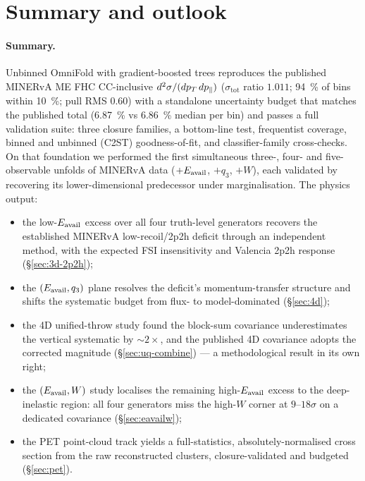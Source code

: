 \section{Summary and outlook}
\label{sec:summary}

\paragraph{Summary.}
Unbinned OmniFold with gradient-boosted trees reproduces the published
MINERvA ME FHC CC-inclusive $d^{2}\sigma/(dp_{T}\,dp_{\parallel})$
($\sigma_{\mathrm{tot}}$ ratio $1.011$; \SI{94}{\percent} of bins within
\SI{10}{\percent}; pull RMS $0.60$) with a standalone uncertainty budget that
matches the published total (\SI{6.87}{\percent} vs \SI{6.86}{\percent}
median per bin) and passes a full validation suite: three closure families, a
bottom-line test, frequentist coverage, binned and unbinned (C2ST)
goodness-of-fit, and classifier-family cross-checks. On that foundation we
performed the first simultaneous three-, four- and five-observable unfolds of
MINERvA data ($+E_{\mathrm{avail}}$, $+q_{3}$, $+W$), each validated by recovering its
lower-dimensional predecessor under marginalisation. The physics output:
\begin{itemize}[itemsep=2pt]
  \item the low-$E_{\mathrm{avail}}$ excess over all four truth-level generators
        recovers the established MINERvA low-recoil/2p2h deficit through an
        independent method, with the expected FSI insensitivity and Valencia
        2p2h response (\S\ref{sec:3d-2p2h});
  \item the $(E_{\mathrm{avail}},q_{3})$ plane resolves the deficit's momentum-transfer
        structure and shifts the systematic budget from flux- to
        model-dominated (\S\ref{sec:4d});
  \item the 4D unified-throw study found the block-sum covariance
        underestimates the vertical systematic by $\sim2\times$, and the
        published 4D covariance adopts the corrected magnitude
        (\S\ref{sec:uq-combine}) --- a methodological result in its own
        right;
  \item the $(E_{\mathrm{avail}},W)$ study localises the remaining high-$E_{\mathrm{avail}}$
        excess to the deep-inelastic region: all four generators miss the
        high-$W$ corner at $9$--$18\sigma$ on a dedicated covariance
        (\S\ref{sec:eavailw});
  \item the PET point-cloud track yields a full-statistics,
        absolutely-normalised cross section from the raw reconstructed
        clusters, closure-validated and budgeted (\S\ref{sec:pet}).
\end{itemize}

